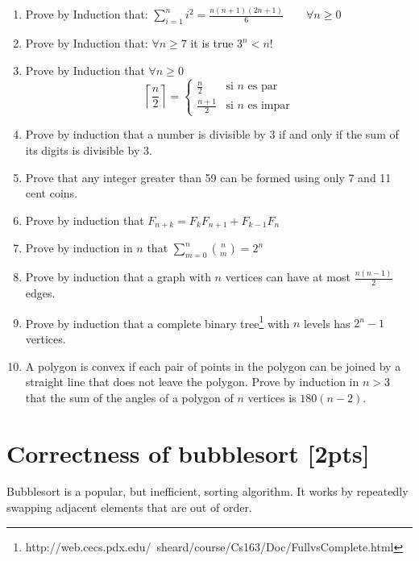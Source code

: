 \documentclass{article}
\begin{document}
\begin{enumerate}
  \item Prove by Induction that:
  \( \sum_{i=1}^{n}i^2=\frac{n(n+1)(2n+1)}{6} \qquad\forall n \geq 0\)

  \item Prove by Induction that:
  $\forall n \geq 7$ it is true $3^n<n!$
  
  \item Prove by Induction that $\forall n \geq 0$
  \[
    \left \lceil\frac{n}{2} \right \rceil=
    \left\{
    \begin{array}{ll}
    \frac{n}{2}& \textrm{si $n$ es par}\\
    \frac{n+1}{2}& \textrm{si $n$ es impar}
    \end{array}
    \right.
  \]
  
    \item Prove by induction that a number is divisible by 3 if and only if the sum of its digits is divisible by 3.
    
    \item Prove that any integer greater than 59 can be formed using only 7 and 11 cent coins.
  
  \item Prove by induction that $F_{n+k}=F_{k}F_{n+1}+F_{k-1}F_{n}$
  
  \item Prove by induction in $n$ that \(\sum_{m=0}^{n}{n \choose m}=2^n\)
  
  \item Prove by induction that a graph with $n$ vertices can have at most  $\frac{n(n-1)}{2}$ edges.
  
  \item Prove by induction that a complete binary tree\footnote{http://web.cecs.pdx.edu/~sheard/course/Cs163/Doc/FullvsComplete.html} with $n$ levels has $2^n-1$ vertices.
  
  \item A polygon is convex if each pair of points in the polygon can be joined by a straight line that does not leave the polygon. Prove by induction in $n>3$ that the sum of the angles of a polygon of $n$ vertices is $180(n-2)$.
  
\end{enumerate}

\section{Correctness of bubblesort [2pts]}
Bubblesort is a popular, but inefficient, sorting algorithm. It works by repeatedly swapping adjacent elements that are out of order.
\end{document}
